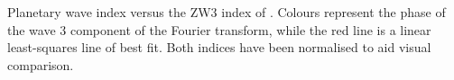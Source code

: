 \label{fig:metric_vs_zw3}
Planetary wave index versus the ZW3 index of \citet{Raphael2004}. Colours represent the phase of the wave 3 component of the Fourier transform, while the red line is a linear least-squares line of best fit. Both indices have been normalised to aid visual comparison.